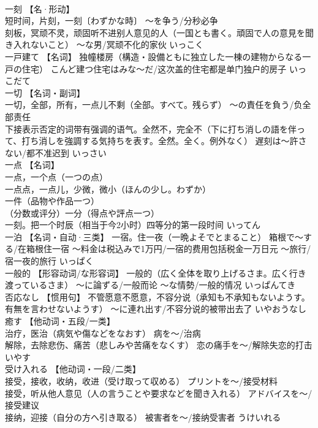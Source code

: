 \documentclass[8pt]{extreport}
\begin{document}
\begin{CJK}{UTF8}{min}
\\	一刻	【名·形动】 
\\	短时间，片刻，一刻〔わずかな時〕 ～を争う/分秒必争 
\\	刻板，冥顽不灵，顽固听不进别人意见的人（一国とも書く。頑固で人の意見を聞き入れないこと） ～な男/冥顽不化的家伙	いっこく	
\\	一戸建て	【名词】 独幢楼房（構造・設備ともに独立した一棟の建物からなる一戸の住宅） こんど建つ住宅はみな～だ/这次盖的住宅都是单门独户的房子	いっこだて	
\\	一切	【名词・副词】 
\\	一切，全部，所有，一点儿不剩（全部。すべて。残らず） ～の責任を負う/负全部责任 
\\	下接表示否定的词带有强调的语气。全然不，完全不（下に打ち消しの語を伴って、打ち消しを強調する気持ちを表す。全然。全く。例外なく） 遅刻は～許さない/都不准迟到	いっさい	
\\	一点	【名词】 
\\	一点，一个点（一つの点） 
\\	一点点，一点儿，少微，微小（ほんの少し。わずか） 
\\	一件（品物や作品一つ） 
\\	（分数或评分）一分（得点や評点一つ） 
\\	一刻。把一个时辰（相当于今2小时）四等分的第一段时间	いってん	
\\	一泊	【名词・自动·三类】 一宿。住一夜（一晩よそでとまること） 箱根で～する/在箱根住一宿 ～料金は税込みで1万円/一宿的费用包括税金一万日元 ～旅行/宿一夜的旅行	いっぱく	
\\	一般的	【形容动词/な形容词】 一般的（広く全体を取り上げるさま。広く行き渡っているさま） ～に論ずる/一般而论 ～な情勢/一般的情况	いっぱんてき	
\\	否応なし	【惯用句】 不管愿意不愿意，不容分说（承知も不承知もないようす。有無を言わせないようす） ～に連れ出す/不容分说的被带出去了	いやおうなし	
\\	癒す	【他动词・五段/一类】 
\\	治疗，医治（病気や傷などをなおす） 病を～/治病 
\\	解除，去除悲伤、痛苦（悲しみや苦痛をなくす） 恋の痛手を～/解除失恋的打击	いやす	
\\	受け入れる	【他动词・一段/二类】 
\\	接受，接收，收纳，收进（受け取って収める） プリントを～/接受材料 
\\	接受，听从他人意见（人の言うことや要求などを聞き入れる） アドバイスを～/接受建议 
\\	接纳，迎接（自分の方へ引き取る） 被害者を～/接纳受害者	うけいれる	

\end{CJK}
\end{document}
